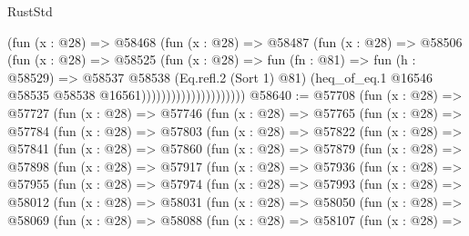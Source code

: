 \begin{lexlean}{RustStd}
\begin{coremodule}
                                  (fun (x : @28) =>
                                  @58468
                                    (fun (x : @28) =>
                                    @58487
                                      (fun (x : @28) =>
                                      @58506
                                        (fun (x : @28) =>
                                        @58525
                                          (fun (x : @28) =>
                                          fun (fn : @81) =>
                                          fun (h : @58529) =>
                                          @58537
                                            @58538
                                            (Eq.refl.{2} (Sort 1) @81)
                                            (heq_of_eq.{1}
                                              @16546
                                              @58535
                                              @58538
                                              @16561)))))))))))))))))))))
@58640 := @57708
    (fun (x : @28) =>
    @57727
      (fun (x : @28) =>
      @57746
        (fun (x : @28) =>
        @57765
          (fun (x : @28) =>
          @57784
            (fun (x : @28) =>
            @57803
              (fun (x : @28) =>
              @57822
                (fun (x : @28) =>
                @57841
                  (fun (x : @28) =>
                  @57860
                    (fun (x : @28) =>
                    @57879
                      (fun (x : @28) =>
                      @57898
                        (fun (x : @28) =>
                        @57917
                          (fun (x : @28) =>
                          @57936
                            (fun (x : @28) =>
                            @57955
                              (fun (x : @28) =>
                              @57974
                                (fun (x : @28) =>
                                @57993
                                  (fun (x : @28) =>
                                  @58012
                                    (fun (x : @28) =>
                                    @58031
                                      (fun (x : @28) =>
                                      @58050
                                        (fun (x : @28) =>
                                        @58069
                                          (fun (x : @28) =>
                                          @58088
                                            (fun (x : @28) =>
                                            @58107
                                              (fun (x : @28) =>

\end{coremodule}
\end{lexlean}
